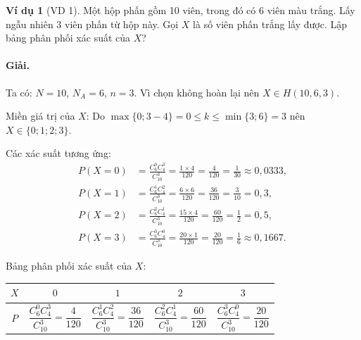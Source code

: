 \documentclass[12pt,a4paper]{article}
\theoremstyle{definition}
\newtheorem{vidu}{Ví dụ}[section]
\begin{document}
\begin{vidu}[VD 1]
Một hộp phấn gồm 10 viên, trong đó có 6 viên màu trắng. Lấy ngẫu nhiên 3 viên phấn từ hộp này. Gọi $X$ là số viên phấn trắng lấy được. Lập bảng phân phối xác suất của $X$?

\paragraph{Giải.}
Ta có: $N = 10$, $N_A = 6$, $n = 3$. Vì chọn không hoàn lại nên $X \in H(10, 6, 3)$.

Miền giá trị của $X$: Do $\max\{0; 3 - 4\} = 0 \le k \le \min\{3; 6\} = 3$ nên $X \in \{0; 1; 2; 3\}$.

Các xác suất tương ứng:
\begin{align*}
P(X = 0) &= \frac{C_6^0 C_4^3}{C_{10}^3} = \frac{1 \times 4}{120} = \frac{4}{120} = \frac{1}{30} \approx 0{,}0333, \\
P(X = 1) &= \frac{C_6^1 C_4^2}{C_{10}^3} = \frac{6 \times 6}{120} = \frac{36}{120} = \frac{3}{10} = 0{,}3, \\
P(X = 2) &= \frac{C_6^2 C_4^1}{C_{10}^3} = \frac{15 \times 4}{120} = \frac{60}{120} = \frac{1}{2} = 0{,}5, \\
P(X = 3) &= \frac{C_6^3 C_4^0}{C_{10}^3} = \frac{20 \times 1}{120} = \frac{20}{120} = \frac{1}{6} \approx 0{,}1667.
\end{align*}

Bảng phân phối xác suất của $X$:
\begin{center}
\renewcommand{\arraystretch}{1.5}
\begin{tabular}{|c|c|c|c|c|}
\hline
$X$ & $0$ & $1$ & $2$ & $3$ \\
\hline
$P$ & $\dfrac{C_6^0 C_4^3}{C_{10}^3} = \dfrac{4}{120}$ & $\dfrac{C_6^1 C_4^2}{C_{10}^3} = \dfrac{36}{120}$ & $\dfrac{C_6^2 C_4^1}{C_{10}^3} = \dfrac{60}{120}$ & $\dfrac{C_6^3 C_4^0}{C_{10}^3} = \dfrac{20}{120}$ \\
\hline
\end{tabular}
\end{center}
\end{vidu}
\end{document}
